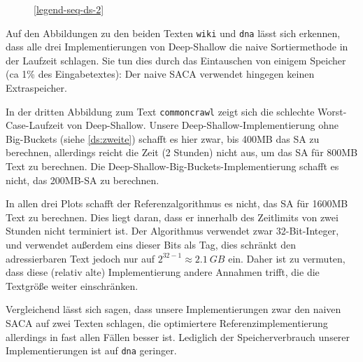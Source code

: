 \begin{figure}[!h]

    \medskip
    \ref{legend-seq-ds-2}
\end{figure}
\FloatBarrier

\noindent
Auf den Abbildungen zu den beiden Texten \texttt{wiki} und \texttt{dna} lässt sich erkennen,
dass alle drei Implementierungen von Deep-Shallow die naive Sortiermethode in der Laufzeit schlagen.
Sie tun dies durch das Eintauschen von einigem Speicher (ca 1\% des Eingabetextes):
Der naive SACA verwendet hingegen keinen Extraspeicher.

In der dritten Abbildung zum Text \texttt{commoncrawl} zeigt sich die schlechte
Worst-Case-Laufzeit von Deep-Shallow.
Unsere Deep-Shallow-Implementierung ohne Big-Buckets (siehe \cref{ds:zweite}) schafft es hier zwar,
bis 400MB das SA zu berechnen, allerdings reicht die Zeit (2 Stunden) nicht aus, um das SA für 800MB Text zu berechnen.
Die Deep-Shallow-Big-Buckets-Implementierung schafft es nicht, das 200MB-SA zu berechnen.

In allen drei Plots schafft der Referenzalgorithmus es nicht, das SA für 1600MB Text zu berechnen.
Dies liegt daran, dass er innerhalb des Zeitlimits von zwei Stunden nicht terminiert ist.
Der Algorithmus verwendet zwar 32-Bit-Integer, und verwendet außerdem eins dieser Bits als Tag,
dies schränkt den adressierbaren Text jedoch nur auf $2^{32 - 1} \approx \SI{2.1}{GB}$ ein.
Daher ist zu vermuten, dass diese (relativ alte) Implementierung andere Annahmen trifft,
die die Textgröße weiter einschränken.

Vergleichend lässt sich sagen, dass unsere Implementierungen zwar den naiven SACA auf zwei Texten schlagen,
die optimiertere Referenzimplementierung allerdings in fast allen Fällen besser ist.
Lediglich der Speicherverbrauch unserer Implementierungen ist auf \texttt{dna} geringer.
